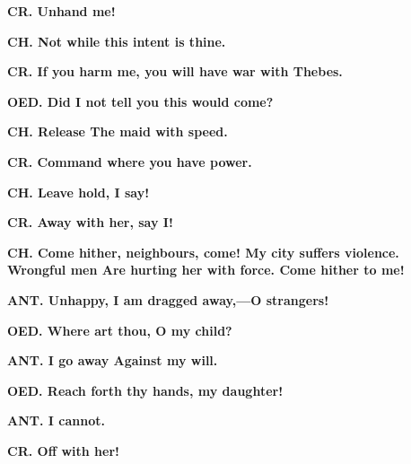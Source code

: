 \documentclass[11pt,letter]{book}
\begin{document}
\par \textbf{CR. Unhand me!}
\par 

\par \textbf{CH. Not while this intent is thine.}
\par 

\par \textbf{CR. If you harm me, you will have war with Thebes.}
\par 

\par \textbf{OED. Did I not tell you this would come?}
\par 

\par \textbf{CH. Release The maid with speed.}
\par 

\par \textbf{CR. Command where you have power.}
\par 

\par \textbf{CH. Leave hold, I say!}
\par 

\par \textbf{CR. Away with her, say I!}
\par 

\par \textbf{CH. Come hither, neighbours, come! My city suffers violence. Wrongful men Are hurting her with force. Come hither to me!}
\par 

\par \textbf{ANT. Unhappy, I am dragged away,—O strangers!}
\par 

\par \textbf{OED. Where art thou, O my child?}
\par 

\par \textbf{ANT. I go away Against my will.}
\par 

\par \textbf{OED. Reach forth thy hands, my daughter!}
\par 

\par \textbf{ANT. I cannot.}
\par 

\par \textbf{CR. Off with her!}
\par 
\end{document}
